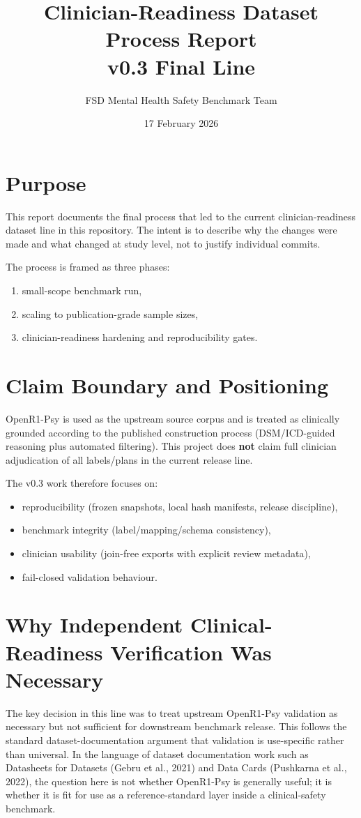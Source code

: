 \documentclass[11pt]{article}
\title{Clinician-Readiness Dataset Process Report\\v0.3 Final Line}
\author{FSD Mental Health Safety Benchmark Team}
\date{17 February 2026}
\begin{document}
\maketitle

\section{Purpose}
This report documents the final process that led to the current clinician-readiness dataset line in this repository. The intent is to describe why the changes were made and what changed at study level, not to justify individual commits.

The process is framed as three phases:
\begin{enumerate}[leftmargin=1.5em]
  \item small-scope benchmark run,
  \item scaling to publication-grade sample sizes,
  \item clinician-readiness hardening and reproducibility gates.
\end{enumerate}

\section{Claim Boundary and Positioning}
OpenR1-Psy is used as the upstream source corpus and is treated as clinically grounded according to the published construction process (DSM/ICD-guided reasoning plus automated filtering). This project does \textbf{not} claim full clinician adjudication of all labels/plans in the current release line.

The v0.3 work therefore focuses on:
\begin{itemize}[leftmargin=1.5em]
  \item reproducibility (frozen snapshots, local hash manifests, release discipline),
  \item benchmark integrity (label/mapping/schema consistency),
  \item clinician usability (join-free exports with explicit review metadata),
  \item fail-closed validation behaviour.
\end{itemize}

\section{Why Independent Clinical-Readiness Verification Was Necessary}
The key decision in this line was to treat upstream OpenR1-Psy validation as necessary but not sufficient for downstream benchmark release. This follows the standard dataset-documentation argument that validation is use-specific rather than universal. In the language of dataset documentation work such as Datasheets for Datasets (Gebru et al., 2021) and Data Cards (Pushkarna et al., 2022), the question here is not whether OpenR1-Psy is generally useful; it is whether it is fit for use as a reference-standard layer inside a clinical-safety benchmark.
\end{document}
